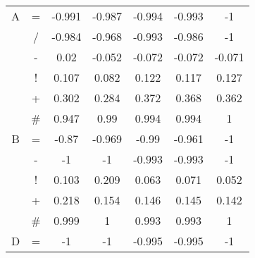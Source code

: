 \documentclass{sfuthesis}
\begin{document}
\begin{table}[]
\begin{tabular}{ccccccc}
		A              & \multicolumn{1}{c|}{=}                & -0.991             & -0.987                & -0.994               & \multicolumn{1}{c|}{-0.993}              & -1            \\
		& \multicolumn{1}{c|}{/}                & -0.984             & -0.968                & -0.993               & \multicolumn{1}{c|}{-0.986}              & -1            \\
		& \multicolumn{1}{c|}{-}                & 0.02               & -0.052                & -0.072               & \multicolumn{1}{c|}{-0.072}              & -0.071        \\
		& \multicolumn{1}{c|}{!}                & 0.107              & 0.082                 & 0.122                & \multicolumn{1}{c|}{0.117}               & 0.127         \\
		& \multicolumn{1}{c|}{+}                & 0.302              & 0.284                 & 0.372                & \multicolumn{1}{c|}{0.368}               & 0.362         \\
		& \multicolumn{1}{c|}{\#}               & 0.947              & 0.99                  & 0.994                & \multicolumn{1}{c|}{0.994}               & 1             \\ \hline
		B              & \multicolumn{1}{c|}{=}                & -0.87              & -0.969                & -0.99                & \multicolumn{1}{c|}{-0.961}              & -1            \\
		& \multicolumn{1}{c|}{-}                & -1                 & -1                    & -0.993               & \multicolumn{1}{c|}{-0.993}              & -1            \\
		& \multicolumn{1}{c|}{!}                & 0.103              & 0.209                 & 0.063                & \multicolumn{1}{c|}{0.071}               & 0.052         \\
		& \multicolumn{1}{c|}{+}                & 0.218              & 0.154                 & 0.146                & \multicolumn{1}{c|}{0.145}               & 0.142         \\
		& \multicolumn{1}{c|}{\#}               & 0.999              & 1                     & 0.993                & \multicolumn{1}{c|}{0.993}               & 1             \\ \hline
		D              & \multicolumn{1}{c|}{=}                & -1                 & -1                    & -0.995               & \multicolumn{1}{c|}{-0.995}              & -1            \\

\end{tabular}
\end{table}
\end{document}
